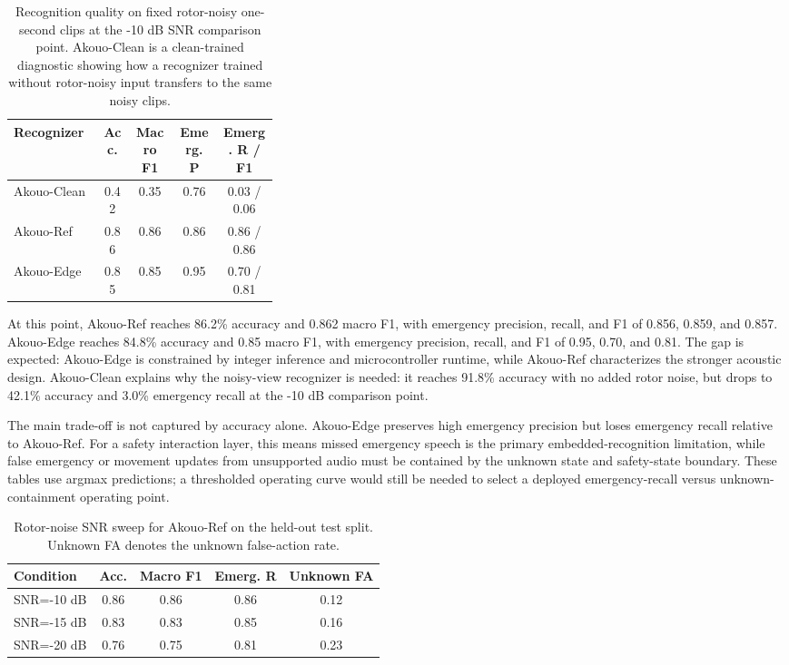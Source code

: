 \begin{table}[t]
    \centering
    \caption{Recognition quality on fixed rotor-noisy one-second clips at the -10 dB SNR comparison point. Akouo-Clean is a clean-trained diagnostic showing how a recognizer trained without rotor-noisy input transfers to the same noisy clips.}
    \label{tab:akouo_recognition_quality}
    \footnotesize
    \setlength{\tabcolsep}{3pt}
    \begin{tabular}{@{}p{0.34\linewidth}cccc@{}}
        \toprule
        Recognizer & Acc. & Macro F1 & Emerg. P & Emerg. R / F1 \\
        \midrule
        Akouo-Clean & 0.42 & 0.35 & 0.76 & 0.03 / 0.06 \\
        Akouo-Ref & 0.86 & 0.86 & 0.86 & 0.86 / 0.86 \\
        Akouo-Edge & 0.85 & 0.85 & 0.95 & 0.70 / 0.81 \\
        \bottomrule
    \end{tabular}
\end{table}

At this point, Akouo-Ref reaches 86.2\% accuracy and 0.862 macro F1, with emergency precision, recall, and F1 of 0.856, 0.859, and 0.857. Akouo-Edge reaches 84.8\% accuracy and 0.85 macro F1, with emergency precision, recall, and F1 of 0.95, 0.70, and 0.81. The gap is expected: Akouo-Edge is constrained by integer inference and microcontroller runtime, while Akouo-Ref characterizes the stronger acoustic design. Akouo-Clean explains why the noisy-view recognizer is needed: it reaches 91.8\% accuracy with no added rotor noise, but drops to 42.1\% accuracy and 3.0\% emergency recall at the -10 dB comparison point.

The main trade-off is not captured by accuracy alone. Akouo-Edge preserves high emergency precision but loses emergency recall relative to Akouo-Ref. For a safety interaction layer, this means missed emergency speech is the primary embedded-recognition limitation, while false emergency or movement updates from unsupported audio must be contained by the unknown state and safety-state boundary. These tables use argmax predictions; a thresholded operating curve would still be needed to select a deployed emergency-recall versus unknown-containment operating point.

\begin{table}[t]
    \centering
    \caption{Rotor-noise SNR sweep for Akouo-Ref on the held-out test split. Unknown FA denotes the unknown false-action rate.}
    \label{tab:rotor_robustness}
    \scriptsize
    \setlength{\tabcolsep}{3pt}
    \begin{tabular}{@{}lcccc@{}}
        \toprule
        Condition & Acc. & Macro F1 & Emerg. R & Unknown FA \\
        \midrule
        SNR=-10 dB & 0.86 & 0.86 & 0.86 & 0.12 \\
        SNR=-15 dB & 0.83 & 0.83 & 0.85 & 0.16 \\
        SNR=-20 dB & 0.76 & 0.75 & 0.81 & 0.23 \\
        \bottomrule
    \end{tabular}
\end{table}

